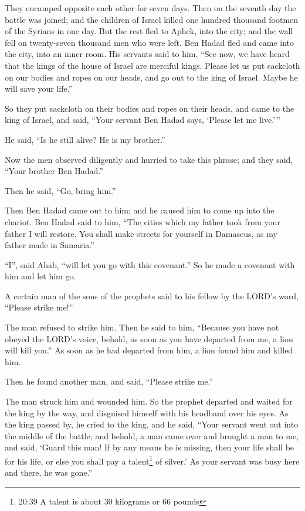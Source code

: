  They encamped opposite each other for seven days. Then on
the seventh day the battle was joined; and the children of Israel killed
one hundred thousand footmen of the Syrians in one day. 
But the rest fled to Aphek, into the city; and the wall fell on
twenty-seven thousand men who were left. Ben Hadad fled and came into
the city, into an inner room.  His servants said to him,
``See now, we have heard that the kings of the house of Israel are
merciful kings. Please let us put sackcloth on our bodies and ropes on
our heads, and go out to the king of Israel. Maybe he will save your
life.''

 So they put sackcloth on their bodies and ropes on their
heads, and came to the king of Israel, and said, ``Your servant Ben
Hadad says, `Please let me live.'\,''

He said, ``Is he still alive? He is my brother.''

 Now the men observed diligently and hurried to take this
phrase; and they said, ``Your brother Ben Hadad.''

Then he said, ``Go, bring him.''

Then Ben Hadad came out to him; and he caused him to come up into the
chariot.  Ben Hadad said to him, ``The cities which my
father took from your father I will restore. You shall make streets for
yourself in Damascus, as my father made in Samaria.''

``I'', said Ahab, ``will let you go with this covenant.'' So he made a
covenant with him and let him go.

 A certain man of the sons of the prophets said to his
fellow by the LORD's word, ``Please strike me!''

The man refused to strike him.  Then he said to him,
``Because you have not obeyed the LORD's voice, behold, as soon as you
have departed from me, a lion will kill you.'' As soon as he had
departed from him, a lion found him and killed him.

 Then he found another man, and said, ``Please strike me.''

The man struck him and wounded him.  So the prophet
departed and waited for the king by the way, and disguised himself with
his headband over his eyes.  As the king passed by, he
cried to the king, and he said, ``Your servant went out into the middle
of the battle; and behold, a man came over and brought a man to me, and
said, `Guard this man! If by any means he is missing, then your life
shall be for his life, or else you shall pay a talent\footnote{20:39 A
  talent is about 30 kilograms or 66 pounds} of silver.' 
As your servant was busy here and there, he was gone.''

